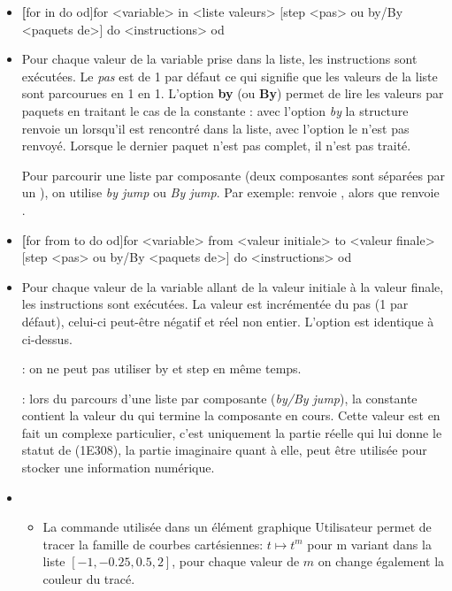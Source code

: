 \begin{itemize}
\item \textbf[for in do od]{for <variable> in <liste valeurs> [step <pas> ou by/By <paquets de>] do <instructions> od} \item \desc Pour chaque valeur de la variable prise dans la liste, les instructions sont exécutées. Le \textit{pas} est de 1 par défaut ce qui signifie que les valeurs de la liste sont parcourues en 1 en 1. L'option \textbf{by} (ou \textbf{By}) permet de lire les valeurs par paquets en traitant le cas de la constante \jump: avec l'option \textit{by} la structure renvoie un \jump lorsqu'il est rencontré dans la liste, avec l'option  le \jump n'est pas renvoyé. Lorsque le dernier paquet n'est pas complet, il n'est pas traité.

Pour parcourir une liste par composante (deux composantes sont séparées par un \jump), on utilise \textsl{by jump} ou \textsl{By jump}. Par exemple:  renvoie \res{[3,jump,12]}, alors que  renvoie \res{[3,12]}.

\item \textbf[for from to do od]{for <variable> from <valeur initiale> to <valeur finale> [step <pas> ou by/By <paquets de>] do <instructions> od}
\item \desc Pour chaque valeur de la variable allant de la valeur initiale à la valeur finale, les instructions sont exécutées. La valeur est incrémentée du pas (1 par défaut), celui-ci peut-être négatif et réel non entier. L'option  est identique à ci-dessus.

: on ne peut pas utiliser by et step en même temps.

: lors du parcours d'une liste par composante (\textsl{by/By jump}), la constante  contient la valeur du \jump qui termine la composante en cours. Cette valeur est en fait un complexe particulier, c'est uniquement la partie réelle qui lui donne le statut de \jump (1E308), la partie imaginaire quant à elle, peut être utilisée pour stocker une information numérique.

\item \exem
    \begin{itemize}
    \item La commande  utilisée dans un élément graphique Utilisateur permet de  tracer la famille de courbes cartésiennes: $t \mapsto t^m$ pour m variant dans la liste $[-1,-0.25,0.5,2]$, pour chaque valeur de $m$ on change également la couleur du tracé.


\end{itemize}
\end{itemize}
